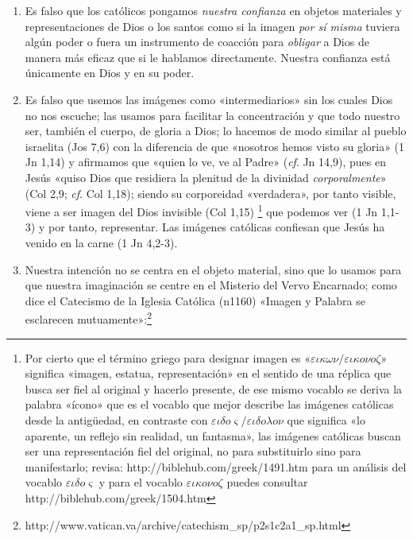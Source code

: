 \documentclass{article}
\begin{document}
\begin{enumerate}
\item
Es falso que los católicos pongamos \emph{nuestra confianza} en objetos materiales y representaciones de Dios o los santos como si la imagen \emph{por sí misma} tuviera algún poder o fuera un instrumento de coacción para \emph{obligar} a Dios de manera más eficaz que si le hablamos directamente. Nuestra confianza está únicamente en Dios y en su poder.

\item
Es falso que usemos las imágenes como «intermediarios» sin los cuales Dios no nos escuche; las usamos para facilitar la concentración y que todo nuestro ser, también el cuerpo, de gloria a Dios; lo hacemos de modo similar al pueblo israelita (Jos 7,6) con la diferencia de que «nosotros hemos visto su gloria» (1 Jn 1,14) y afirmamos que «quien lo ve, ve al Padre» (\emph{cf}. Jn 14,9), pues en Jesús «quiso Dios que residiera la plenitud de la divinidad \emph{corporalmente}» (Col 2,9; \emph{cf}. Col 1,18); siendo su corporeidad «verdadera», por tanto visible, viene a ser imagen del Dios invisible (Col 1,15)%
    \footnote{Por cierto que el término griego para designar imagen es «$\varepsilon \iota \kappa \omega \nu / \varepsilon \iota \kappa o \nu o \zeta$» significa «imagen, estatua, representación» en el sentido de una réplica que busca ser fiel al original y hacerlo presente, de ese mismo vocablo se deriva la palabra «ícono» que es el vocablo que mejor describe las imágenes católicas desde la antigüedad, en contraste con $\varepsilon \iota \delta o \varsigma/\varepsilon \iota \delta o \lambda o \nu$ que significa «lo aparente, un reflejo sin realidad, un fantasma», las imágenes católicas buscan ser una representación fiel del original, no para substituirlo sino para manifestarlo; revisa: http://biblehub.com/greek/1491.htm para un análisis del vocablo $\varepsilon \iota \delta o \varsigma$ y para el vocablo $\varepsilon \iota \kappa o \nu o \zeta$ puedes consultar http://biblehub.com/greek/1504.htm}
que podemos ver (1 Jn 1,1-3) y por tanto, representar. Las imágenes católicas confiesan que Jesús ha venido en la carne (1 Jn 4,2-3).

\item
Nuestra intención no se centra en el objeto material, sino que lo usamos para que nuestra imaginación se centre en el Misterio del Vervo Encarnado; como dice el Catecismo de la Iglesia Católica (n1160) «Imagen y Palabra se esclarecen mutuamente»:\footnote{http://www.vatican.va/archive/catechism\_sp/p2s1c2a1\_sp.html}


\end{enumerate}
\end{document}
